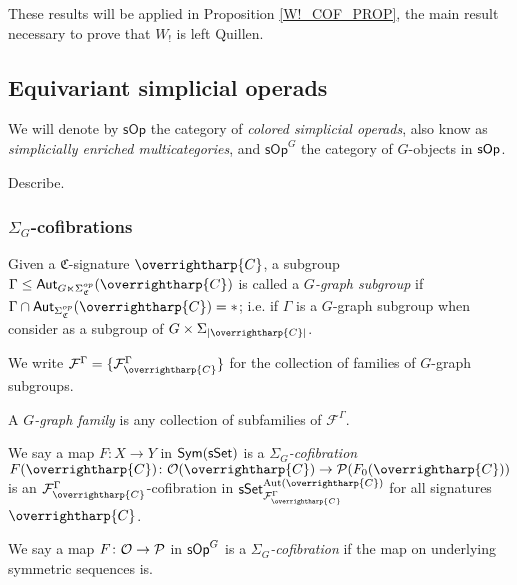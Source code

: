 \documentclass[a4paper,10pt
,draft
]{article}%
\renewcommand{\F}{\mathcal F}
\renewcommand{\1}{\eta}%
\newcommand{\vect}[1]{\text{\overrightharp{\ensuremath{#1}}}}
\begin{document}
These results will be applied in Proposition \ref{W!_COF_PROP}, the main result necessary to prove that $W_!$ is left Quillen.








\subsection{Equivariant simplicial operads}

We will denote by $\mathsf{sOp}$ the category of \textit{colored simplicial operads}, also know as \textit{simplicially enriched multicategories},
and $\mathsf{sOp}^G$ the category of $G$-objects in $\mathsf{sOp}$.

\begin{definition}
      Describe.
\end{definition}



\subsubsection{$\Sigma_G$-cofibrations}

\begin{definition}
      \label{GRAPHSUB_DEF}
      Given a $\mathfrak{C}$-signature $\vect C$, 
      a subgroup 
      $\Gamma \leq \mathsf{Aut}_{G \ltimes \Sigma_{\mathfrak{C}}^{op}}(\vect C)$
      is called a \textit{$G$-graph subgroup} if
      $\Gamma \cap \mathsf{Aut}_{\Sigma_{\mathfrak{C}}^{op}}(\vect C) = \**$;
      i.e. if $\Gamma$ is a $G$-graph subgroup when consider as a subgroup of $G \times \Sigma_{|\vect C|}$.
      
      We write $\mathcal{F}^{\Gamma} = \{\mathcal{F}^{\Gamma}_{\vect C}\}$
      for the collection of families of $G$-graph subgroups.

      A \textit{$G$-graph family} is any collection of subfamilies of $\F^\Gamma$.
\end{definition}

\begin{definition}
      We say a map $F \colon X \to Y$ in $\mathsf{Sym}(\mathsf{sSet})$ is a \textit{$\Sigma_G$-cofibration}
      $F(\vect C)\colon \O(\vect C) \to \P(F_0(\vect C))$ is an $\mathcal F^\Gamma_{\vect C}$-cofibration in $\sSet^{\Aut(\vect C)}_{\F^\Gamma_{\vect  C}}$
      for all signatures $\vect C$.
      
      We say a map $F \colon \mathcal{O} \to \mathcal{P}$ in $\mathsf{sOp}^G$ is a \textit{$\Sigma_G$-cofibration} if
      the map on underlying symmetric sequences is.
\end{definition}
\end{document}
